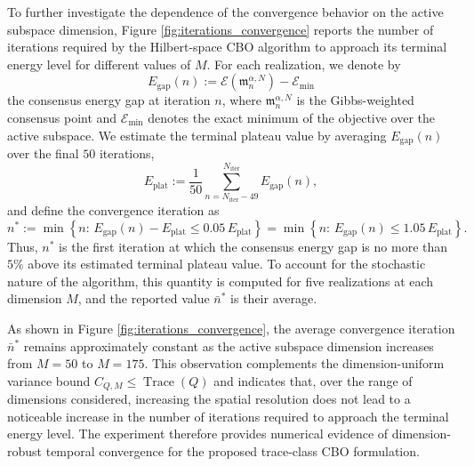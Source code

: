 \documentclass[12pt]{amsart}
\numberwithin{equation}{section}
\begin{document}
To further investigate the dependence of the convergence behavior on the active subspace dimension, Figure \ref{fig:iterations_convergence} reports the number of iterations required by the Hilbert-space CBO algorithm to approach its terminal energy level for different values of $M$. For each realization, we denote by
\begin{equation*}
    E_{\mathrm{gap}}(n) := \mathscr{E}(\mathfrak{m}_n^{\alpha,N})-\mathscr{E}_{\min}
\end{equation*}
the consensus energy gap at iteration $n$, where $\mathfrak{m}_n^{\alpha,N}$ is the Gibbs-weighted consensus point and $\mathscr{E}_{\min}$ denotes the exact minimum of the objective over the active subspace. We estimate the terminal plateau value by averaging $E_{\mathrm{gap}}(n)$ over the final $50$ iterations,
\begin{equation*}
    E_{\mathrm{plat}} := \frac{1}{50} \sum_{n=N_{\mathrm{iter}}-49}^{N_{\mathrm{iter}}} E_{\mathrm{gap}}(n),
\end{equation*}
and define the convergence iteration as
\begin{equation*}
    n^* := \min\left\{n:\,
    E_{\mathrm{gap}}(n)-E_{\mathrm{plat}}
    \leq 0.05 \,E_{\mathrm{plat}}
    \right\}
    =
    \min\left\{n:\,
    E_{\mathrm{gap}}(n)
    \leq 1.05\,E_{\mathrm{plat}}
    \right\}.
\end{equation*}
Thus, $n^*$ is the first iteration at which the consensus energy gap is no more than $5\%$ above its estimated terminal plateau value. To account for the stochastic nature of the algorithm, this quantity is computed for five realizations at each dimension $M$, and the reported value $\bar{n}^*$ is their average.

As shown in Figure \ref{fig:iterations_convergence}, the average convergence iteration $\bar{n}^*$ remains approximately constant as the active subspace dimension increases from $M=50$ to $M=175$. This observation complements the dimension-uniform variance bound $C_{Q,M}\leq\operatorname{Trace}(Q)$ and indicates that, over the range of dimensions considered, increasing the spatial resolution does not lead to a noticeable increase in the number of iterations required to approach the terminal energy level. The experiment therefore provides numerical evidence of dimension-robust temporal convergence for the proposed trace-class CBO formulation.
\end{document}
